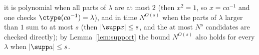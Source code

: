
it is polynomial when all parts of $\lambda$ are at most $2$ (then $x^{2}=1$, so $x=ca^{-1}$ and one checks
$\ctype(ca^{-1})=\lambda$), and in time $N^{O(s)}$ when the parts of $\lambda$ larger than $1$ sum to at most $s$ (then
$|\supp x|\le s$, and the at most $N^{s}$ candidates are checked directly); by Lemma~\ref{lem:support} the bound $N^{O(s)}$ also
holds for every $\lambda$ when $|\supp a|\le s$.

